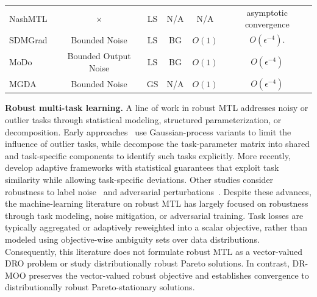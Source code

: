 \documentclass[twoside]{article} %
\theoremstyle{plain}
\theoremstyle{definition}
\theoremstyle{remark}
\begin{document}
\begin{table}[ht!]
{\begin{tabular}{lccccc}
NashMTL~\citep{nashMTL} & $\times$ & LS & N/A & N/A & asymptotic convergence\\
SDMGrad~\citep{SDMkaiyiJi} & Bounded Noise & LS & BG &$O(1)$& $O(\epsilon^{-4})$.  \\
MoDo~\citep{MODO} & Bounded Output Noise & LS & BG & $O(1)$&  $O(\epsilon^{-4})$  \\
MGDA~\citep{qimgda} & Bounded Noise & GS & N/A & ${O}(1)$ & ${O}(\epsilon^{-4})$ \\
\bottomrule
\end{tabular}}
\label{Table: Comparison with existing methods}
\end{table}

\textbf{Robust multi-task learning.}
A line of work in robust MTL addresses noisy or outlier tasks through statistical modeling, structured parameterization, or decomposition. Early approaches~\citep{robustmtl1} use Gaussian-process variants to limit the influence of outlier tasks, while \citet{robustmtl2} decompose the task-parameter matrix into shared and task-specific components to identify such tasks explicitly. More recently, \citet{robustMTL3} develop adaptive frameworks with statistical guarantees that exploit task similarity while allowing task-specific deviations. Other studies consider robustness to label noise~\citep{robustMTL4} and adversarial perturbations~\citep{robustMTL5}. Despite these advances, the machine-learning literature on robust MTL has largely focused on robustness through task modeling, noise mitigation, or adversarial training. Task losses are typically aggregated or adaptively reweighted into a scalar objective, rather than modeled using objective-wise ambiguity sets over data distributions. Consequently, this literature does not formulate robust MTL as a vector-valued DRO problem or study distributionally robust Pareto solutions. In contrast, DR-MOO preserves the vector-valued robust objective and establishes convergence to distributionally robust Pareto-stationary solutions.
\end{document}
